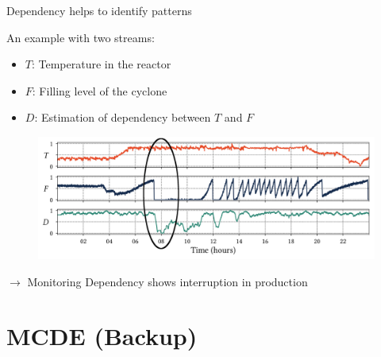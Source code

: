 \documentclass[16pt,usenames,dvipsnames, notheorems]{beamer}
\theoremstyle{definition}
\theoremstyle{example}
\theoremstyle{plain}
\begin{document}
\begin{frame}{Dependency helps to identify patterns}

An example with two streams:
\begin{itemize}
	\item $T$: Temperature in the reactor
	\item $F$: Filling level of the cyclone
	\item $D$: Estimation of dependency between $T$ and $F$
\end{itemize}

\begin{figure}
	\centering
	\begin{overprint}
		  \includegraphics[width=0.90 \linewidth]{figures/bioliq_prep_s_2_after.jpg}
	\end{overprint}
\end{figure}
\vspace{-0.5cm}
$\rightarrow$ Monitoring Dependency shows interruption in production 

\end{frame}

\section{MCDE (Backup)}
\end{document}
